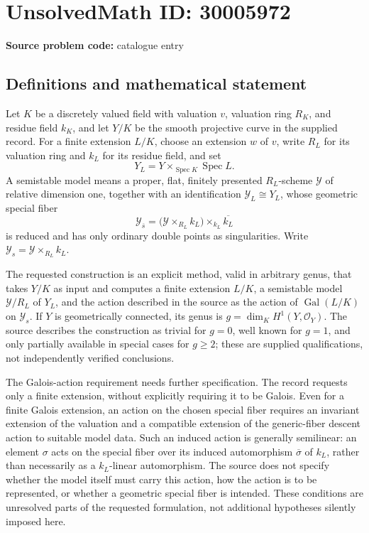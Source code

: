 \documentclass[11pt]{article}
\begin{document}
\section*{UnsolvedMath ID: 30005972}
\textbf{Source problem code:} catalogue entry
\subsection{Definitions and mathematical statement}
Let \(K\) be a discretely valued field with valuation \(v\), valuation ring \(R_K\), and residue field \(k_K\), and let \(Y/K\) be the smooth projective curve in the supplied record. For a finite extension \(L/K\), choose an extension \(w\) of \(v\), write \(R_L\) for its valuation ring and \(k_L\) for its residue field, and set
\[
Y_L=Y\times_{\operatorname{Spec}K}\operatorname{Spec}L.
\]
A semistable model means a proper, flat, finitely presented \(R_L\)-scheme \(\mathcal Y\) of relative dimension one, together with an identification \(\mathcal Y_L\cong Y_L\), whose geometric special fiber
\[
\mathcal Y_{\overline s}=\bigl(\mathcal Y\times_{R_L}k_L\bigr)\times_{k_L}\overline{k_L}
\]
is reduced and has only ordinary double points as singularities. Write \(\mathcal Y_s=\mathcal Y\times_{R_L}k_L\).

The requested construction is an explicit method, valid in arbitrary genus, that takes \(Y/K\) as input and computes a finite extension \(L/K\), a semistable model \(\mathcal Y/R_L\) of \(Y_L\), and the action described in the source as the action of \(\operatorname{Gal}(L/K)\) on \(\mathcal Y_s\). If \(Y\) is geometrically connected, its genus is \(g=\dim_K H^1(Y,\mathcal O_Y)\). The source describes the construction as trivial for \(g=0\), well known for \(g=1\), and only partially available in special cases for \(g\geq2\); these are supplied qualifications, not independently verified conclusions.

The Galois-action requirement needs further specification. The record requests only a finite extension, without explicitly requiring it to be Galois. Even for a finite Galois extension, an action on the chosen special fiber requires an invariant extension of the valuation and a compatible extension of the generic-fiber descent action to suitable model data. Such an induced action is generally semilinear: an element \(\sigma\) acts on the special fiber over its induced automorphism \(\overline\sigma\) of \(k_L\), rather than necessarily as a \(k_L\)-linear automorphism. The source does not specify whether the model itself must carry this action, how the action is to be represented, or whether a geometric special fiber is intended. These conditions are unresolved parts of the requested formulation, not additional hypotheses silently imposed here.
\end{document}
